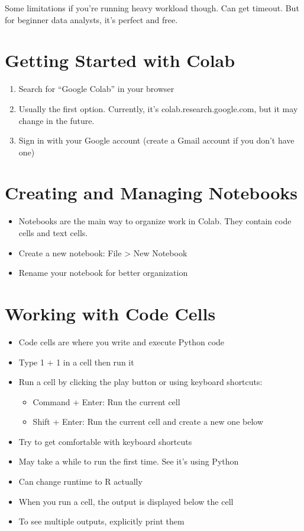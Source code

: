 \documentclass[
  letterpaper,
  DIV=11,
  numbers=noendperiod]{scrreprt}
\providecommand{\tightlist}{%
  \setlength{\itemsep}{0pt}\setlength{\parskip}{0pt}}\usepackage{longtable,booktabs,array}
\begin{document}
Some limitations if you're running heavy workload though. Can get
timeout. But for beginner data analysts, it's perfect and free.

\section{Getting Started with Colab}\label{getting-started-with-colab}

\begin{enumerate}
\def\labelenumi{\arabic{enumi}.}
\tightlist
\item
  Search for ``Google Colab'' in your browser
\item
  Usually the first option. Currently, it's colab.research.google.com,
  but it may change in the future.
\item
  Sign in with your Google account (create a Gmail account if you don't
  have one)
\end{enumerate}

\section{Creating and Managing
Notebooks}\label{creating-and-managing-notebooks}

\begin{itemize}
\tightlist
\item
  Notebooks are the main way to organize work in Colab. They contain
  code cells and text cells.
\item
  Create a new notebook: File \textgreater{} New Notebook
\item
  Rename your notebook for better organization
\end{itemize}

\section{Working with Code Cells}\label{working-with-code-cells}

\begin{itemize}
\item
  Code cells are where you write and execute Python code
\item
  Type 1 + 1 in a cell then run it
\item
  Run a cell by clicking the play button or using keyboard shortcuts:

  \begin{itemize}
  \tightlist
  \item
    Command + Enter: Run the current cell
  \item
    Shift + Enter: Run the current cell and create a new one below
  \end{itemize}
\item
  Try to get comfortable with keyboard shortcuts
\item
  May take a while to run the first time. See it's using Python
\item
  Can change runtime to R actually
\item
  When you run a cell, the output is displayed below the cell
\item
  To see multiple outputs, explicitly print them
\end{itemize}
\end{document}

